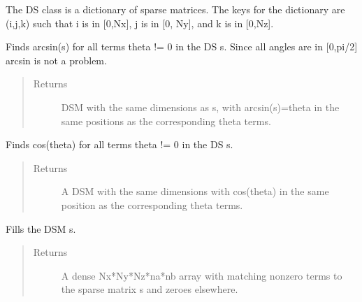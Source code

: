 \documentclass[letterpaper,10pt,english]{sphinxmanual}
\begin{document}
\begin{fulllineitems}
\label{index:DictionarySparseMatrix.DS}
The DS class is a dictionary of sparse matrices.
The keys for the dictionary are (i,j,k) such that i is in {[}0,Nx{]},
j is in {[}0, Ny{]}, and k is in {[}0,Nz{]}.

\begin{fulllineitems}
\label{index:DictionarySparseMatrix.DS.asin}
Finds arcsin(s) for all terms theta != 0 in the DS s. Since     all angles are in {[}0,pi/2{]} arcsin is not a problem.
\begin{quote}\begin{description}
\item[{Returns}] \leavevmode
DSM with the same dimensions as s, with arcsin(s)=theta in      the same positions as the corresponding theta terms.

\end{description}\end{quote}

\end{fulllineitems}


\begin{fulllineitems}
\label{index:DictionarySparseMatrix.DS.cos}
Finds cos(theta) for all terms theta != 0 in the DS s.
\begin{quote}\begin{description}
\item[{Returns}] \leavevmode
A DSM with the same dimensions with cos(theta) in the      same position as the corresponding theta terms.

\end{description}\end{quote}

\end{fulllineitems}


\begin{fulllineitems}
\label{index:DictionarySparseMatrix.DS.dense}
Fills the DSM s.
\begin{quote}\begin{description}
\item[{Returns}] \leavevmode
A dense Nx*Ny*Nz*na*nb array with matching nonzero terms to      the sparse matrix s and zeroes elsewhere.


\end{description}
\end{quote}
\end{fulllineitems}
\end{fulllineitems}
\end{document}
